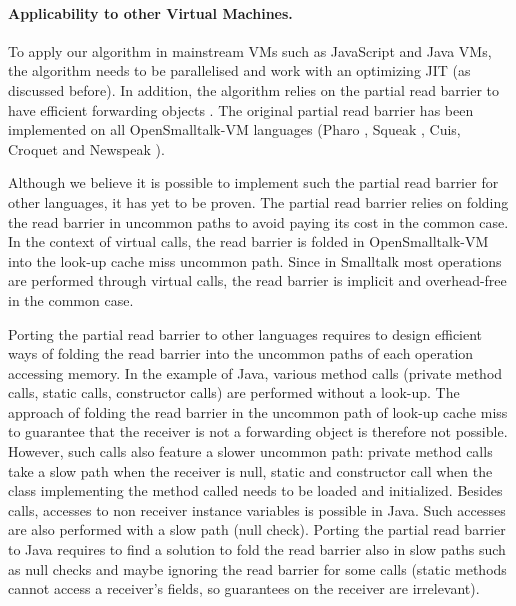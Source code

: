 \documentclass[sigplan,10pt,screen]{acmart}\settopmatter{printfolios=true,printccs=true,printacmref=true}
\newcommand{\todo}[1]{\color{orange}\fbox{\bfseries\sffamily\scriptsize TODO:}{\sf\small$\blacktriangleright$\textit{#1}$\blacktriangleleft$}\color{black}}
\def\OpenSmalltalkVM{OpenSmalltalk-VM\xspace}
\begin{document}
\paragraph{Applicability to other Virtual Machines.}
To apply our algorithm in mainstream VMs such as JavaScript and Java VMs, the algorithm needs to be parallelised and work with an optimizing JIT (as discussed before).
In addition, the algorithm relies on the partial read barrier to have efficient forwarding objects \cite{Forwarders}. The original partial read barrier has been implemented on all \OpenSmalltalkVM languages (Pharo \cite{PharoByExample}, Squeak \cite{SqueakByExample}, Cuis, Croquet and Newspeak \cite{NewspeakOopsla}).

Although we believe it is possible to implement such the partial read barrier for other languages, it has yet to be proven. The partial read barrier relies on folding the read barrier in uncommon paths to avoid paying its cost in the common case. In the context of virtual calls, the read barrier is folded in \OpenSmalltalkVM into the look-up cache miss uncommon path. Since in Smalltalk most operations are performed through virtual calls, the read barrier is implicit and overhead-free in the common case. 

Porting the partial read barrier to other languages requires to design efficient ways of folding the read barrier into the uncommon paths of each operation accessing memory. In the example of Java, various method calls (private method calls, static calls, constructor calls) are performed without a look-up. The approach of folding the read barrier in the uncommon path of look-up cache miss to guarantee that the receiver is not a forwarding object is therefore not possible. However, such calls also feature a slower uncommon path: private method calls take a slow path when the receiver is null, static and constructor call when the class implementing the method called needs to be loaded and initialized. Besides calls, accesses to non receiver instance variables is possible in Java. Such accesses are also performed with a slow path (null check). Porting the partial read barrier to Java requires to find a solution to fold the read barrier also in slow paths such as null checks and maybe ignoring the read barrier for some calls (static methods cannot access a receiver's fields, so guarantees on the receiver are irrelevant).
\end{document}
